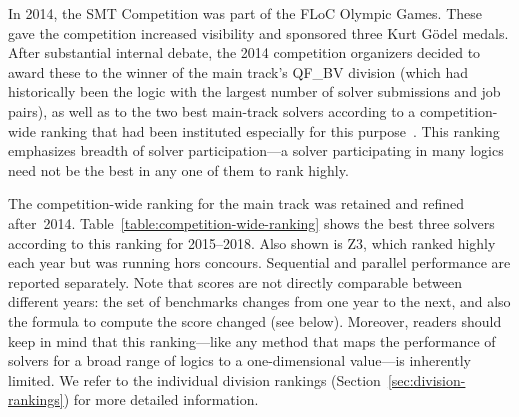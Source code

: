 \documentclass[twoside,11pt]{article}
\begin{document}
In 2014, the SMT Competition was part of the FLoC Olympic Games.
These gave the competition increased visibility and sponsored three
Kurt G\"odel medals.  After substantial internal debate, the 2014
competition organizers decided to award these to the winner of the
main track's QF\_BV division (which had historically been the logic
with the largest number of solver submissions and job pairs), as well
as to the two best main-track solvers according to a competition-wide
ranking that had been instituted especially for this
purpose~\cite{CDW14}.  This ranking emphasizes breadth of solver
participation---a solver participating in many logics need not be the
best in any one of them to rank highly.

The competition-wide ranking for the main track was retained and
refined after~2014.  Table~\ref{table:competition-wide-ranking} shows
the best three solvers according to this ranking for 2015--2018.  Also
shown is Z3, which ranked highly each year but was running hors
concours.  Sequential and parallel performance are reported
separately.
%
Note that scores are not directly comparable between different years:
the set of benchmarks changes from one year to the next, and also the
formula to compute the score changed (see below).  Moreover, readers
should keep in mind that this ranking---like any method that maps the
performance of solvers for a broad range of logics to a
one-dimensional value---is inherently limited.  We refer to the
individual division rankings (Section~\ref{sec:division-rankings}) for
more detailed information.
\end{document}
